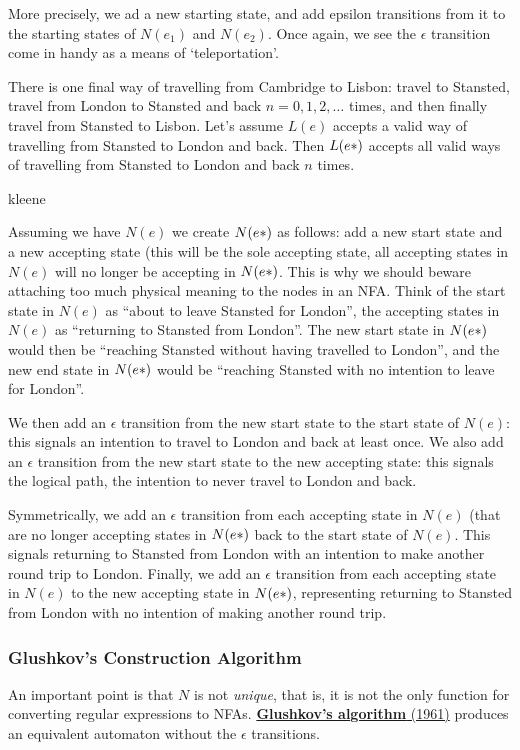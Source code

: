 More precisely, we ad a new starting state, and add epsilon transitions from it to the starting states of $N(e_1)$ and $N(e_2)$. Once again, we see the $\epsilon$ transition come in handy as a means of `teleportation'.

There is one final way of travelling from Cambridge to Lisbon: travel to Stansted, travel from London to Stansted and back $n = 0, 1, 2, \ldots$ times, and then finally travel from Stansted to Lisbon. Let's assume $L(e)$ accepts a valid way of travelling from Stansted to London and back. Then $L(e\*)$ accepts all valid ways of travelling from Stansted to London and back $n$ times. 

\begin{center}
    {kleene}
\end{center}

Assuming we have $N(e)$ we create $N(e\*)$ as follows: add a new start state and a new accepting state (this will be the sole accepting state, all accepting states in $N(e)$ will no longer be accepting in $N(e\*)$. This is why we should beware attaching too much physical meaning to the nodes in an NFA. Think of the start state in $N(e)$ as ``about to leave Stansted for London'', the accepting states in $N(e)$ as ``returning to Stansted from London''. The new start state in $N(e\*)$ would then be ``reaching Stansted without having travelled to London'', and the new end state in $N(e\*)$ would be ``reaching Stansted with no intention to leave for London''. 

We then add an $\epsilon$ transition from the new start state to the start state of $N(e)$: this signals an intention to travel to London and back at least once. We also add an $\epsilon$ transition from the new start state to the new accepting state: this signals the logical path, the intention to never travel to London and back. 

Symmetrically, we add an $\epsilon$ transition from each accepting state in $N(e)$ (that are no longer accepting states in $N(e\*)$ back to the start state of $N(e)$. This signals returning to Stansted from London with an intention to make another round trip to London. Finally, we add an $\epsilon$ transition from each accepting state in $N(e)$ to the new accepting state in $N(e\*)$, representing returning to Stansted from London with no intention of making another round trip.

\subsubsection{Glushkov's Construction Algorithm}
An important point is that $N$ is not \emph{unique}, that is, it is not the only function for converting regular expressions to NFAs. \href{https://en.wikipedia.org/wiki/Glushkov\%27s\_construction_algorithm}{\textbf{Glushkov's algorithm} (1961)} produces an equivalent automaton without the $\epsilon$ transitions.

